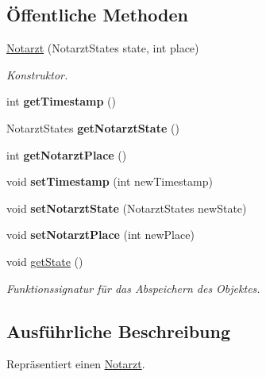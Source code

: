 \subsection*{Öffentliche Methoden}
\begin{DoxyCompactItemize}
\item 
\hyperlink{classNotarzt_af90cdea1ef049791cf09cd6d1e9f8399}{Notarzt} (Notarzt\+States state, int place)
\begin{DoxyCompactList}\small\item\em Konstruktor. \end{DoxyCompactList}\item 
int {\bfseries get\+Timestamp} ()\hypertarget{classNotarzt_af94182cd4fc47929260c9ce3e129028f}{}\label{classNotarzt_af94182cd4fc47929260c9ce3e129028f}

\item 
Notarzt\+States {\bfseries get\+Notarzt\+State} ()\hypertarget{classNotarzt_a460b020d5f78bf43de6d82b30315bc68}{}\label{classNotarzt_a460b020d5f78bf43de6d82b30315bc68}

\item 
int {\bfseries get\+Notarzt\+Place} ()\hypertarget{classNotarzt_a066e840824b26d97d7e02f5eb697bf33}{}\label{classNotarzt_a066e840824b26d97d7e02f5eb697bf33}

\item 
void {\bfseries set\+Timestamp} (int new\+Timestamp)\hypertarget{classNotarzt_a2443bb2d3a8fad6ad868db80d93add93}{}\label{classNotarzt_a2443bb2d3a8fad6ad868db80d93add93}

\item 
void {\bfseries set\+Notarzt\+State} (Notarzt\+States new\+State)\hypertarget{classNotarzt_a08bfaf5815206e487ff29d87f0e9ab0c}{}\label{classNotarzt_a08bfaf5815206e487ff29d87f0e9ab0c}

\item 
void {\bfseries set\+Notarzt\+Place} (int new\+Place)\hypertarget{classNotarzt_a3ccdfae8cbaebbe4d0ff049f05e78016}{}\label{classNotarzt_a3ccdfae8cbaebbe4d0ff049f05e78016}

\item 
void \hyperlink{classNotarzt_a938d1d749b2741f3dc426e24a437c43c}{get\+State} ()
\begin{DoxyCompactList}\small\item\em Funktionssignatur für das Abspeichern des Objektes. \end{DoxyCompactList}\end{DoxyCompactItemize}


\subsection{Ausführliche Beschreibung}
Repräsentiert einen \hyperlink{classNotarzt}{Notarzt}. 

